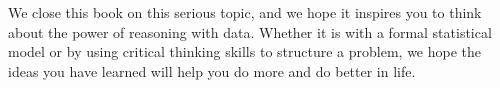 
We close this book on this serious topic,
and we hope it inspires you to think about
the power of reasoning with data.
Whether it is with a formal statistical model
or by using critical thinking skills to structure
a problem, we hope the ideas you have learned will
help you do more and do better in life.

